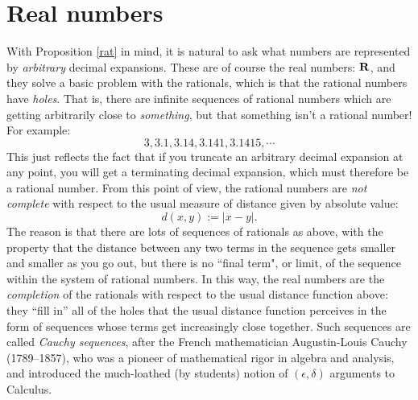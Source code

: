 \documentclass[11pt,oneside]{amsart}
\begin{document}
\section{Real numbers}

With Proposition \ref{rat} in mind, it is natural to ask what numbers are represented by {\em arbitrary} decimal expansions.
These are of course the real numbers: $\mathbf{R}$, and they solve a basic problem with the rationals, which is that the rational numbers have {\em holes}.
That is, there are infinite sequences of rational numbers which are getting arbitrarily close to {\em something}, but that something isn't a rational number!
For example:
\[
	3, 3.1, 3.14, 3.141, 3.1415, \cdots
\]
This just reflects the fact that if you truncate an arbitrary decimal expansion at any point, you will get a terminating decimal expansion, 
which must therefore be a rational number.  
From this point of view, the rational numbers are {\em not complete} with respect to the usual measure of distance given by absolute value:
\[
	d(x,y) := |x - y|.
\]
The reason is that there are lots of sequences of rationals as above, with the property that the distance between any two terms
in the sequence gets smaller and smaller as you go out, but there is no ``final term", or limit, of the sequence within the system of 
rational numbers.  In this way, the real numbers are the {\em completion} of the rationals with respect to the usual distance function above:
they ``fill in'' all of the holes that the usual distance function perceives in the form of sequences whose terms get increasingly close together.
Such sequences are called {\em Cauchy sequences}, after the French mathematician Augustin-Louis Cauchy (1789--1857), who
was a pioneer of mathematical rigor in algebra and analysis,
 and introduced the much-loathed (by students) notion of $(\epsilon,\delta)$
arguments to Calculus.
\end{document}
